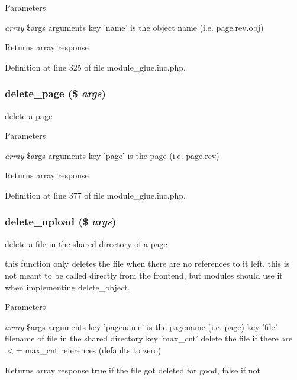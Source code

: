 \begin{DoxyParams}{Parameters}
\item[{\em array}]\$args arguments key 'name' is the object name (i.e. page.rev.obj) \end{DoxyParams}
\begin{DoxyReturn}{Returns}
array response 
\end{DoxyReturn}


Definition at line 325 of file module\_\-glue.inc.php.

\hypertarget{module__glue_8inc_8php_af11541a6869804225793b82e54fa09fe}{
\subsubsection[{delete\_\-page}]{\setlength{\rightskip}{0pt plus 5cm}delete\_\-page (\$ {\em args})}}
\label{module__glue_8inc_8php_af11541a6869804225793b82e54fa09fe}
delete a page


\begin{DoxyParams}{Parameters}
\item[{\em array}]\$args arguments key 'page' is the page (i.e. page.rev) \end{DoxyParams}
\begin{DoxyReturn}{Returns}
array response 
\end{DoxyReturn}


Definition at line 377 of file module\_\-glue.inc.php.

\hypertarget{module__glue_8inc_8php_aa4865d52ac449f8aaadb3a5d425f2efb}{
\subsubsection[{delete\_\-upload}]{\setlength{\rightskip}{0pt plus 5cm}delete\_\-upload (\$ {\em args})}}
\label{module__glue_8inc_8php_aa4865d52ac449f8aaadb3a5d425f2efb}
delete a file in the shared directory of a page

this function only deletes the file when there are no references to it left. this is not meant to be called directly from the frontend, but modules should use it when implementing delete\_\-object. 
\begin{DoxyParams}{Parameters}
\item[{\em array}]\$args arguments key 'pagename' is the pagename (i.e. page) key 'file' filename of file in the shared directory key 'max\_\-cnt' delete the file if there are $<$= max\_\-cnt references (defaults to zero) \end{DoxyParams}
\begin{DoxyReturn}{Returns}
array response true if the file got deleted for good, false if not 
\end{DoxyReturn}



